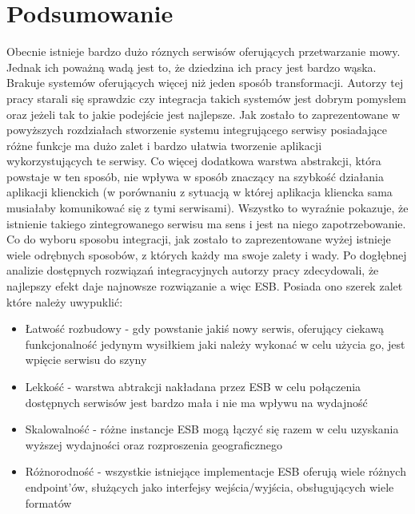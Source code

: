 
\chapter{Podsumowanie} %



\ifpdf
    \graphicspath{{7/figures/PNG/}{7/figures/PDF/}{7/figures/}}
\else
    \graphicspath{{7/figures/EPS/}{7/figures/}}
\fi

Obecnie istnieje bardzo dużo róznych serwisów oferujących przetwarzanie mowy. Jednak ich poważną wadą jest to, że dziedzina ich pracy jest bardzo wąska. Brakuje systemów oferujących więcej niż jeden sposób transformacji. Autorzy tej pracy starali się sprawdzic czy integracja takich systemów jest dobrym pomysłem oraz jeżeli tak to jakie podejście jest najlepsze. Jak zostało to zaprezentowane w powyższych rozdziałach stworzenie systemu integrującego serwisy posiadające różne funkcje ma dużo zalet i bardzo ułatwia tworzenie aplikacji wykorzystujących te serwisy. Co więcej dodatkowa warstwa abstrakcji, która powstaje w ten sposób, nie wpływa w sposób znaczący na szybkość działania aplikacji klienckich (w porównaniu z sytuacją w której aplikacja kliencka sama musiałaby komunikować się z tymi serwisami). Wszystko to wyraźnie pokazuje, że istnienie takiego zintegrowanego serwisu ma sens i jest na niego zapotrzebowanie. \\
Co do wyboru sposobu integracji, jak zostało to zaprezentowane wyżej istnieje wiele odrębnych sposobów, z których każdy ma swoje zalety i wady. Po dogłębnej analizie dostępnych rozwiązań integracyjnych autorzy pracy zdecydowali, że najlepszy efekt daje najnowsze rozwiązanie a więc ESB. Posiada ono szerek zalet które należy uwypuklić:
\begin{itemize}
	\item Łatwość rozbudowy - gdy powstanie jakiś nowy serwis, oferujący ciekawą funkcjonalność jedynym wysiłkiem jaki należy wykonać w celu użycia go, jest wpięcie serwisu do szyny
	\item Lekkość - warstwa abtrakcji nakładana przez ESB w celu połączenia dostępnych serwisów jest bardzo mała i nie ma wpływu na wydajność
	\item Skalowalność - różne instancje ESB mogą łączyć się razem w celu uzyskania wyższej wydajności oraz rozproszenia geograficznego
	\item Różnorodność - wszystkie istniejące implementacje ESB oferują wiele różnych endpoint'ów, służących jako interfejsy wejścia/wyjścia, obsługujących wiele formatów
\end{itemize}
